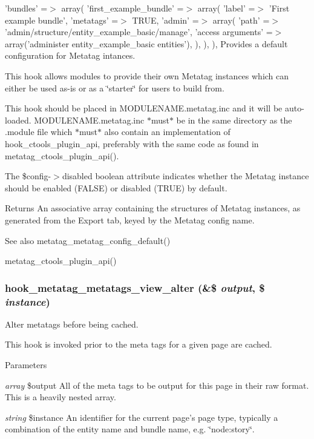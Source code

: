 'bundles' =$>$ array( 'first\_\-example\_\-bundle' =$>$ array( 'label' =$>$ 'First example bundle', 'metatags' =$>$ TRUE, 'admin' =$>$ array( 'path' =$>$ 'admin/structure/entity\_\-example\_\-basic/manage', 'access arguments' =$>$ array('administer entity\_\-example\_\-basic entities'), ), ), ), Provides a default configuration for Metatag intances.

This hook allows modules to provide their own Metatag instances which can either be used as-\/is or as a \char`\"{}starter\char`\"{} for users to build from.

This hook should be placed in MODULENAME.metatag.inc and it will be auto-\/ loaded. MODULENAME.metatag.inc $\ast$must$\ast$ be in the same directory as the .module file which $\ast$must$\ast$ also contain an implementation of hook\_\-ctools\_\-plugin\_\-api, preferably with the same code as found in metatag\_\-ctools\_\-plugin\_\-api().

The \$config-\/$>$disabled boolean attribute indicates whether the Metatag instance should be enabled (FALSE) or disabled (TRUE) by default.

\begin{DoxyReturn}{Returns}
An associative array containing the structures of Metatag instances, as generated from the Export tab, keyed by the Metatag config name.
\end{DoxyReturn}
\begin{DoxySeeAlso}{See also}
metatag\_\-metatag\_\-config\_\-default() 

metatag\_\-ctools\_\-plugin\_\-api() 
\end{DoxySeeAlso}
\hypertarget{metatag_8api_8php_a1a58a0a75630be58619b59923f79374c}{
\subsubsection[{hook\_\-metatag\_\-metatags\_\-view\_\-alter}]{\setlength{\rightskip}{0pt plus 5cm}hook\_\-metatag\_\-metatags\_\-view\_\-alter (\&\$ {\em output}, \/  \$ {\em instance})}}
\label{metatag_8api_8php_a1a58a0a75630be58619b59923f79374c}
Alter metatags before being cached.

This hook is invoked prior to the meta tags for a given page are cached.


\begin{DoxyParams}{Parameters}
\item[{\em array}]\$output All of the meta tags to be output for this page in their raw format. This is a heavily nested array. \item[{\em string}]\$instance An identifier for the current page's page type, typically a combination of the entity name and bundle name, e.g. \char`\"{}node:story\char`\"{}. \end{DoxyParams}
